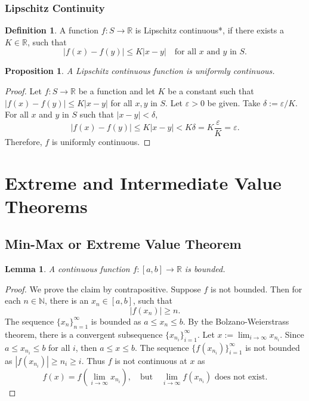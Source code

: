 \documentclass{article}
\newtheorem{lemma}[theorem]{Lemma}
\newtheorem{prop}[theorem]{Proposition}
\theoremstyle{definition}
\newtheorem{defi}{Definition}[section]
\begin{document}
\subsubsection{Lipschitz Continuity}

\begin{defi}
    A function \( f: S \rightarrow \mathbb{R} \) is Lipschitz continuous*, if there exists a \( K \in \mathbb{R} \), such that
\[
|f(x) - f(y)| \leq K|x - y| \quad \text{for all } x \text{ and } y \text{ in } S.
\]
\end{defi}

\begin{prop}
    A Lipschitz continuous function is uniformly continuous.
\end{prop}

\begin{proof}
    Let \( f: S \rightarrow \mathbb{R} \) be a function and let \( K \) be a constant such that \( |f(x) - f(y)| \leq K|x - y| \) for all \( x, y \) in \( S \). Let \( \varepsilon > 0 \) be given. Take \( \delta := \varepsilon / K \). For all \( x \) and \( y \) in \( S \) such that \( |x - y| < \delta \),
\[
|f(x) - f(y)| \leq K|x - y| < K\delta = K\frac{\varepsilon}{K} = \varepsilon.
\]
Therefore, \( f \) is uniformly continuous. 
\end{proof}










\section{Extreme and Intermediate Value Theorems}

\subsection{Min-Max or Extreme Value Theorem}

\begin{lemma}
    A continuous function $f:[a,b]\rightarrow \mathbb{R}$ is bounded.
\end{lemma}


\begin{proof}
    We prove the claim by contrapositive. Suppose \( f \) is not bounded. Then for each \( n \in \mathbb{N} \), there is an \( x_n \in [a, b] \), such that
    \[
    \left| f(x_n) \right| \geq n.
    \]
    The sequence \( \{x_n\}_{n=1}^{\infty} \) is bounded as \( a \leq x_n \leq b \). By the Bolzano-Weierstrass theorem, there is a convergent subsequence \( \{x_{n_i}\}_{i=1}^{\infty} \). Let \( x := \lim_{i \rightarrow \infty} x_{n_i} \). Since \( a \leq x_{n_i} \leq b \) for all \( i \), then \( a \leq x \leq b \). The sequence \( \{f(x_{n_i})\}_{i=1}^{\infty} \) is not bounded as \( \left| f(x_{n_i}) \right| \geq n_i \geq i \). Thus \( f \) is not continuous at \( x \) as
    \[
    f(x) = f\left( \lim_{i \rightarrow \infty} x_{n_i} \right), \quad \text{but} \quad \lim_{i \rightarrow \infty} f(x_{n_i}) \text{ does not exist.}
    \]
\end{proof}
\end{document}
